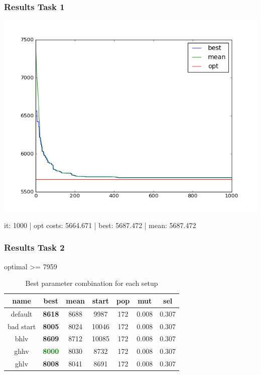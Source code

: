 \documentclass[
]{beamer}
\begin{document}
    \begin{frame}
    	\frametitle{Results Task 1}
		\includegraphics[width=\textwidth]{task1.png}
        \begin{center}
        it:  1000 | opt costs: 5664.671 | best: 5687.472 | mean: 5687.472
        \end{center}
    \end{frame}

    
    \begin{frame}
    	\frametitle{Results Task 2}
        	\begin{minipage}{\linewidth}
              \begin{table} 
              \centering
              \caption{optimal >= 7959}
                  \begin{tabular}{c|ccc|ccc}
                  {\bf name} & {\bf best} & {\bf mean} & {\bf start} & {\bf pop} & {\bf mut} & {\bf sel}\\
                  \toprule[1.pt]
                  default & {\bf 8618} & 8688 & 9987 & 172 & 0.008 & 0.307\\
                  bad start & {\bf 8005} & 8024 & 10046 & 172 & 0.008 & 0.307\\
                  bhlv & {\bf 8609} & 8712 & 10085 & 172 & 0.008 & 0.307\\
                  ghhv & \textcolor{green}{\bf 8000} & 8030 & 8732 & 172 & 0.008 & 0.307\\
                  ghlv & {\bf 8008} & 8041 & 8691 & 172 & 0.008 & 0.307\\
                  \bottomrule[1.pt]
                  \end{tabular}
              \\[10pt]
			  \caption*{Best parameter combination for each setup}
              \end{table}
        	\end{minipage}
    \end{frame}
    
\end{document}
